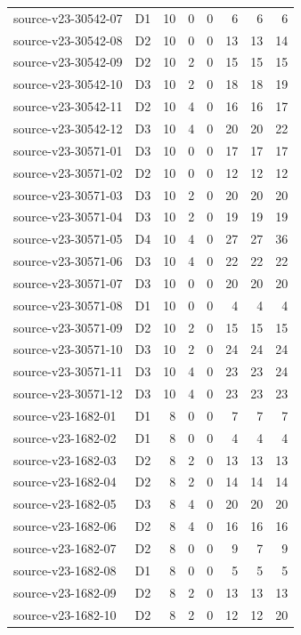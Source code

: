 \begin{longtable}{p{}lrrrrrr}
source-v23-30542-07 & D1 & 10 & 0 & 0 & 6 & 6 & 6\\
source-v23-30542-08 & D2 & 10 & 0 & 0 & 13 & 13 & 14\\
source-v23-30542-09 & D2 & 10 & 2 & 0 & 15 & 15 & 15\\
source-v23-30542-10 & D3 & 10 & 2 & 0 & 18 & 18 & 19\\
source-v23-30542-11 & D2 & 10 & 4 & 0 & 16 & 16 & 17\\
source-v23-30542-12 & D3 & 10 & 4 & 0 & 20 & 20 & 22\\
source-v23-30571-01 & D3 & 10 & 0 & 0 & 17 & 17 & 17\\
source-v23-30571-02 & D2 & 10 & 0 & 0 & 12 & 12 & 12\\
source-v23-30571-03 & D3 & 10 & 2 & 0 & 20 & 20 & 20\\
source-v23-30571-04 & D3 & 10 & 2 & 0 & 19 & 19 & 19\\
source-v23-30571-05 & D4 & 10 & 4 & 0 & 27 & 27 & 36\\
source-v23-30571-06 & D3 & 10 & 4 & 0 & 22 & 22 & 22\\
source-v23-30571-07 & D3 & 10 & 0 & 0 & 20 & 20 & 20\\
source-v23-30571-08 & D1 & 10 & 0 & 0 & 4 & 4 & 4\\
source-v23-30571-09 & D2 & 10 & 2 & 0 & 15 & 15 & 15\\
source-v23-30571-10 & D3 & 10 & 2 & 0 & 24 & 24 & 24\\
source-v23-30571-11 & D3 & 10 & 4 & 0 & 23 & 23 & 24\\
source-v23-30571-12 & D3 & 10 & 4 & 0 & 23 & 23 & 23\\
source-v23-1682-01 & D1 & 8 & 0 & 0 & 7 & 7 & 7\\
source-v23-1682-02 & D1 & 8 & 0 & 0 & 4 & 4 & 4\\
source-v23-1682-03 & D2 & 8 & 2 & 0 & 13 & 13 & 13\\
source-v23-1682-04 & D2 & 8 & 2 & 0 & 14 & 14 & 14\\
source-v23-1682-05 & D3 & 8 & 4 & 0 & 20 & 20 & 20\\
source-v23-1682-06 & D2 & 8 & 4 & 0 & 16 & 16 & 16\\
source-v23-1682-07 & D2 & 8 & 0 & 0 & 9 & 7 & 9\\
source-v23-1682-08 & D1 & 8 & 0 & 0 & 5 & 5 & 5\\
source-v23-1682-09 & D2 & 8 & 2 & 0 & 13 & 13 & 13\\
source-v23-1682-10 & D2 & 8 & 2 & 0 & 12 & 12 & 20\\

\end{longtable}
